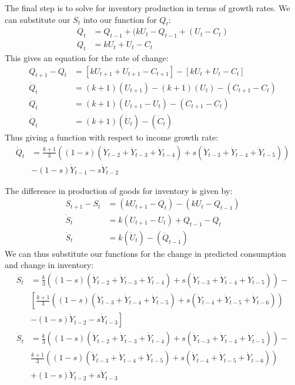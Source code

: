The final step is to solve for inventory production in terms of growth rates. We can substitute our $S_t$ into our function for $Q_t$:
\begin{align*}
    Q_t&=Q_{t-1}+(kU_t-Q_{t-1}+(U_t-C_t)\\
    Q_t&=kU_t+U_t-C_t
\end{align*}
This gives an equation for the rate of change:
\begin{align*}
    Q_{t+1}-Q_{t}&=\left[kU_{t+1}+U_{t+1}-C_{t+1}\right]-\left[kU_{t}+U_{t}-C_{t}\right]\\
    \dot Q_t&= (k+1)(U_{t+1})-(k+1)(U_t)-(C_{t+1}-C_t)\\
    \dot Q_t&= (k+1)(U_{t+1}-U_t)-(C_{t+1}-C_t)\\
    \dot Q_t&=(k+1)(\dot U_t)-(\dot C_t)
\end{align*}
Thus giving a function with respect to income growth rate:
\begin{equation}
\begin{split}
    \dot Q_t& = \frac{k+1}{3}\left((1-s)(\dot Y_{t-2}+\dot Y_{t-3}+\dot Y_{t-4})+s(\dot Y_{t-3}+\dot Y_{t-4}+\dot Y_{t-5})\right)\\
    &-(1-s)\dot Y_{t-1}-s\dot Y_{t-2}
\end{split}
\end{equation}

The difference in production of goods for inventory is given by:
\begin{align*}
    S_{t+1}-S_{t}& =(kU_{t+1}-Q_{t})-(kU_{t}-Q_{t-1})\\
    \dot S_t &= k(U_{t+1}-U_t)+Q_{t-1}-Q_t\\
    \dot S_t& = k(\dot U_t)-(\dot Q_{t-1})
\end{align*}
We can thus substitute our functions for the change in predicted consumption and change in inventory:
\begin{equation*}
\begin{split}
    \dot S_t& =\frac{k}{3}\left((1-s)(\dot Y_{t-2}+\dot Y_{t-3}+\dot Y_{t-4})+s(\dot Y_{t-3}+\dot Y_{t-4}+\dot Y_{t-5})\right)-\\
    &\left[\frac{k+1}{3}\left((1-s)(\dot Y_{t-3}+\dot Y_{t-4}+\dot Y_{t-5})+s(\dot Y_{t-4}+\dot Y_{t-5}+\dot Y_{t-6})\right)\right.\\
    &\left.-(1-s)\dot Y_{t-2}-s\dot Y_{t-3}\right]
\end{split}
\end{equation*}
\begin{equation}
\begin{split}
    \dot S_t& =\frac{k}{3}\left((1-s)(\dot Y_{t-2}+\dot Y_{t-3}+\dot Y_{t-4})+s(\dot Y_{t-3}+\dot Y_{t-4}+\dot Y_{t-5})\right)-\\
    &\frac{k+1}{3}\left((1-s)(\dot Y_{t-3}+\dot Y_{t-4}+\dot Y_{t-5})+s(\dot Y_{t-4}+\dot Y_{t-5}+\dot Y_{t-6})\right)\\
    &+(1-s)\dot Y_{t-2}+s\dot Y_{t-3}
\end{split}
\end{equation}

